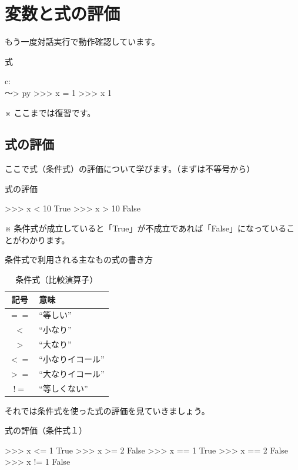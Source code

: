 \documentclass[11pt,a4paper,dvipdfmx,titlepage]{jsreport}
\begin{document}
\section{変数と式の評価}


もう一度{\gt 対話実行}で動作確認しています。
\begin{grabox}{式}
\begin{listing}{1}
c:\\～> py
>>> x = 1
>>> x
1
\end{listing}
\end{grabox}
※ ここまでは復習です。
\subsection{式の評価}
ここで式（条件式）の評価について学びます。（まずは不等号から）
\begin{grabox}{式の評価}
\begin{listingcont}
>>> x < 10
True
>>> x > 10
False
\end{listingcont}
\end{grabox}
※ 条件式が成立していると「True」が不成立であれば「False」になっていることがわかります。

\newpage 
条件式で利用される主なもの式の書き方
\begin{table}[h]
 \begin{center}
    \caption{条件式（比較演算子）}
\begin{tabular}{|c|p{4cm}|} 
\hline
記号 & 意味　\\ \hline \hline
 $ == $ & “等しい” \\ \hline
 $ < $ & “小なり” \\ \hline
 $ > $ & “大なり” \\ \hline
 $ <= $ & “小なりイコール” \\ \hline
 $ >= $ & “大なりイコール” \\ \hline
 $ != $ & “等しくない” \\ \hline
\end{tabular}
\end{center}
\end{table}


それでは条件式を使った式の評価を見ていきましょう。
\begin{grabox}{式の評価（条件式１）}
\begin{listingcont}
>>> x <= 1
True
>>> x >= 2
False
>>> x == 1
True
>>> x == 2
False
>>>  x != 1
False
\end{listingcont}
\end{grabox}
\end{document}
